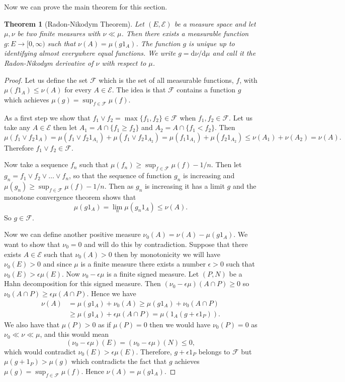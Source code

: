 \documentclass[11pt]{article}
\newtheorem{thm}{Theorem}[section]
\theoremstyle{definition}
\theoremstyle{remark}
\begin{document}
Now we can prove the main theorem for this section.
\begin{thm}[Radon-Nikodym Theorem]
Let $(E, \mathcal{E})$ be a measure space and let $\mu, \nu$ be two finite measures with $\nu \ll \mu$. Then there exists a measurable function $g: E \rightarrow [0, \infty)$ such that $\nu(A) = \mu(g1_A)$. The function $g$ is unique up to identifying almost everywhere equal functions. We write $g = \mathrm{d}\nu/\mathrm{d}\mu$ and call it the Radon-Nikodym derivative of $\nu$ with respect to $\mu$.
\end{thm}
\begin{proof}
Let us define the set $\mathcal{F}$ which is the set of all measurable functions, $f$, with $\mu(f1_A) \leq \nu(A)$ for every $A \in \mathcal{E}$. The idea is that $\mathcal{F}$ contains a function $g$ which achieves $\mu(g) = \sup_{f \in \mathcal{F}} \mu(f)$.

As a first step we show that $f_1 \vee f_2 = \max\{ f_1, f_2\} \in \mathcal{F}$ when $f_1, f_2 \in \mathcal{F}$. Let us take any $A \in \mathcal{E}$ then let $A_1 = A \cap \{ f_1 \geq f_2\}$ and $A_2 = A \cap \{ f_1 < f_2\}$. Then 
\[ \mu(f_1 \vee f_2 1_A) = \mu(f_1 \vee f_2 1_{A_1}) + \mu(f_1 \vee f_2 1_{A_2}) = \mu(f_1 1_{A_1}) + \mu(f_2 1_{A_2}) \leq \nu(A_1) + \nu(A_2) = \nu(A).  \] Therefore $f_1 \vee f_2 \in \mathcal{F}$.

Now take a sequence $f_n$ such that $\mu(f_n) \geq \sup_{f \in \mathcal{F}} \mu(f) - 1/n$. Then let $g_n = f_1 \vee f_2 \vee \dots \vee f_n$, so that the sequence of function $g_n$ is increasing and $\mu(g_n) \geq \sup_{f \in \mathcal{F}} \mu(f) - 1/n$.  Then as $g_n$ is increasing it has a limit $g$ and the monotone convergence theorem shows that 
\[ \mu(g1_A) = \lim_n \mu(g_n1_A) \leq \nu(A). \] So $g \in \mathcal{F}$. 

Now we can define another positive measure $\nu_0(A) = \nu(A) - \mu(g1_A)$. We want to show that $\nu_0 =0$ and will do this by contradiction. Suppose that there exists $A \in \mathcal{E}$ such that $\nu_0(A)>0$ then by monotonicity we will have $\nu_0(E) >0$ and since $\mu$ is a finite measure there exists a number $\epsilon >0$ such that $\nu_0(E) > \epsilon \mu(E)$. Now $\nu_0 - \epsilon \mu$ is a finite signed measure. Let $(P, N)$ be a Hahn decomposition for this signed measure. Then $(\nu_0 - \epsilon \mu)(A \cap P) \geq 0$ so $\nu_0(A\cap P) \geq \epsilon \mu(A \cap P)$. Hence we have
\begin{align*}
\nu(A) &= \mu(g1_A) + \nu_0(A) \geq \mu(g1_A) + \nu_0(A \cap P) \\
& \geq \mu(g1_A) + \epsilon \mu(A \cap P) = \mu(1_A(g +\epsilon 1_{P})).
\end{align*}
We also have that $\mu(P) >0$ as if $\mu(P) = 0$ then we would have $\nu_0(P)=0$ as $\nu_0 \ll \nu \ll \mu$, and this would mean \[ (\nu_0 - \epsilon \mu)(E) = (\nu_0 - \epsilon \mu)(N) \leq 0, \] which would contradict $\nu_0(E) > \epsilon \mu(E)$. Therefore, $g+ \epsilon 1_P$ belongs to $\mathcal{F}$ but $\mu(g+1_P) > \mu(g)$ which contradicts the fact that $g$ achieves $\mu(g) = \sup_{f \in \mathcal{F}} \mu(f)$. Hence $\nu(A) = \mu(g1_A)$. 


\end{proof}
\end{document}
